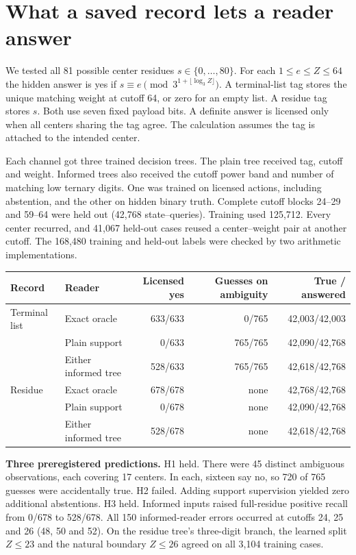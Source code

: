 \documentclass[11pt,letterpaper]{article}
\newcommand{\reportsection}[2]{\clearpage\section{#1}\label{#2}}
\begin{document}
\reportsection{What a saved record lets a reader answer}{sec:reader}
We tested all 81 possible center residues $s\in\{0,\ldots,80\}$. For each $1\le e\le Z\le64$ the hidden answer is yes if $s\equiv e\pmod{3^{1+\lfloor\log_3 Z\rfloor}}$. A terminal-list tag stores the unique matching weight at cutoff 64, or zero for an empty list. A residue tag stores $s$. Both use seven fixed payload bits. A definite answer is licensed only when all centers sharing the tag agree. The calculation assumes the tag is attached to the intended center.
\par\smallskip
Each channel got three trained decision trees. The plain tree received tag, cutoff and weight. Informed trees also received the cutoff power band and number of matching low ternary digits. One was trained on licensed actions, including abstention, and the other on hidden binary truth. Complete cutoff blocks 24--29 and 59--64 were held out (42,768 state--queries). Training used 125,712. Every center recurred, and 41,067 held-out cases reused a center--weight pair at another cutoff. The 168,480 training and held-out labels were checked by two arithmetic implementations.
\begin{center}\small
\begin{tabular}{@{}llrrr@{}}
\toprule Record & Reader & Licensed yes & Guesses on ambiguity & True / answered\\\midrule
Terminal list & Exact oracle & 633/633 & 0/765 & 42,003/42,003\\
 & Plain support & 0/633 & 765/765 & 42,090/42,768\\
 & Either informed tree & 528/633 & 765/765 & 42,618/42,768\\
Residue & Exact oracle & 678/678 & none & 42,768/42,768\\
 & Plain support & 0/678 & none & 42,090/42,768\\
 & Either informed tree & 528/678 & none & 42,618/42,768\\\bottomrule
\end{tabular}\end{center}
\textbf{Three preregistered predictions.} H1 held. There were 45 distinct ambiguous observations, each covering 17 centers. In each, sixteen say no, so 720 of 765 guesses were accidentally true. H2 failed. Adding support supervision yielded zero additional abstentions. H3 held. Informed inputs raised full-residue positive recall from 0/678 to 528/678. All 150 informed-reader errors occurred at cutoffs 24, 25 and 26 (48, 50 and 52). On the residue tree's three-digit branch, the learned split $Z\le23$ and the natural boundary $Z\le26$ agreed on all 3,104 training cases.
\end{document}

